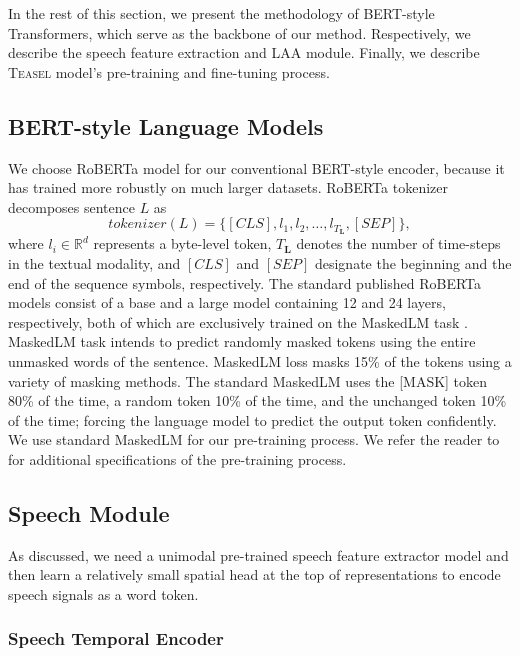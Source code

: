 \documentclass[letterpaper]{article} \usepackage{spconf,amsmath,graphicx}
\newcommand{\teasel}{\textsc{Teasel }}
\begin{document}
In the rest of this section, we present the methodology of BERT-style Transformers, which serve as the backbone of our method. Respectively, we describe the speech feature extraction and LAA module. Finally, we describe \teasel model's pre-training and fine-tuning process.


\subsection{BERT-style Language Models}

We choose RoBERTa model \cite{liu2019roberta} for our conventional BERT-style encoder, because it has trained more robustly on much larger datasets. RoBERTa tokenizer decomposes sentence $L$  as 
\begin{equation}
    tokenizer(L) = \{[CLS], l_1, l_2, \dots, l_{T_{\mathbf{L}}}, [SEP]\}, 
\end{equation}
where $l_{i} \in \mathbb{R}^{d}$ represents a byte-level token, $T_{\mathbf{L}}$ denotes the number of time-steps in the textual modality, and $[CLS]$ and $[SEP]$ designate the beginning and the end of the sequence symbols, respectively. The standard published RoBERTa models consist of a base and a large model containing 12 and 24 layers, respectively, both of which are exclusively trained on the MaskedLM task \cite{devlin2018bert}. MaskedLM task intends to predict randomly masked tokens using the entire unmasked words of the sentence. MaskedLM loss masks 15\% of the tokens using a variety of masking methods. The standard MaskedLM \cite{devlin2018bert} uses the [MASK] token 80\% of the time, a random token 10\% of the time, and the unchanged token 10\% of the time; forcing the language model to predict the output token confidently. We use standard MaskedLM for our pre-training process. We refer the reader to \cite{devlin2018bert,liu2019roberta} for additional specifications of the pre-training process. 

\subsection{Speech Module}

As discussed, we need a unimodal pre-trained speech feature extractor model and then learn a relatively small spatial head at the top of representations to encode speech signals as a word token.


\subsubsection{Speech Temporal Encoder}
\end{document}
